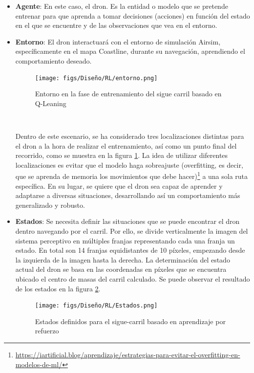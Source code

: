   \begin{itemize} 
    \item \textbf{Agente}: En este caso, el dron. Es la entidad o modelo que se pretende entrenar para que aprenda a tomar decisiones (acciones) en función del estado en el que se 
    encuentre y de las observaciones que vea en el entorno. 
    
    \item \textbf{Entorno}: El dron interactuará con el entorno de simulación Airsim, específicamente en el mapa Coastline, durante su navegación, aprendiendo el comportamiento deseado.

    \begin{figure} [H]
      \begin{center}
        \texttt{[image: figs/Diseño/RL/entorno.png]}
      \end{center}
      \caption{Entorno en la fase de entrenamiento del sigue carril basado en Q-Leaning}
      \label{fig:Entorno}
    \end{figure}\

    Dentro de este escenario, se ha considerado tres localizaciones distintas para el dron a la hora de realizar el entrenamiento, así como un punto final del recorrido, como se muestra en la figura
    \ref{fig:Entorno}. La idea de utilizar diferentes localizaciones es evitar que el modelo haga sobreajuste (overfitting, es decir, que se aprenda de memoria los movimientos que debe hacer)\footnote{\url{https://iartificial.blog/aprendizaje/estrategias-para-evitar-el-overfitting-en-modelos-de-ml/}} 
    a una sola ruta específica. En su lugar, se quiere que el dron 
    sea capaz de aprender y adaptarse a diversas situaciones, desarrollando así un comportamiento más generalizado y robusto.
    
    \item \textbf{Estados}: Se necesita definir las situaciones que se puede encontrar el dron dentro navegando por el carril. Por ello, se divide verticalmente la imagen del sistema perceptivo
    en múltiples franjas representando cada una franja un estado. En total son 14 franjas equidistantes de 10 píxeles, empezando desde la izquierda de la imagen hasta la derecha. La determinación
    del estado actual del dron se basa en las coordenadas en píxeles que se encuentra ubicado el centro de masas del carril calculado. Se puede observar el 
    resultado de los estados en la figura \ref{fig:Estados}. 
    
    \begin{figure} [H]
      \begin{center}
        \texttt{[image: figs/Diseño/RL/Estados.png]}
      \end{center}
      \caption{Estados definidos para el sigue-carril basado en aprendizaje por refuerzo}
      \label{fig:Estados}
    \end{figure}


\end{itemize}
